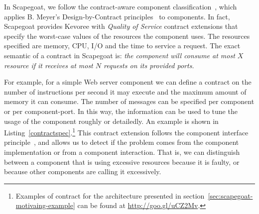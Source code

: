 In Scapegoat, we follow the contract-aware component classification~\cite{Beugnard774917}, which applies B. Meyer's Design-by-Contract principles~\cite{Meyer:1992:ADC:618974.619797} to components.
In fact, Scapegoat provides Kevoree with \textit{Quality of Service} contract extensions that specify the worst-case values of the resources the component uses.
The resources specified are memory, CPU, I/O and the time to service a request.
The exact semantic of a contract in Scapegoat is: \textit{the component will consume at most $X$ resource if it receives at most $N$ requests on its provided ports.}  

For example, for a simple Web server component we can define a contract on the number of instructions per second it may execute \cite{Binder200645} and the maximum amount of memory it can consume.
The number of messages can be specified per component or per component-port.
In this way, the information can be used to tune the usage of the component roughly or detailedly.
An example is shown in Listing~\ref{contractspec}.\footnote{Examples of contract for the architecture presented in section~\ref{sec:scapegoat-motivaing-example} can be found at \url{http://goo.gl/uCZ2Mv}.} This contract extension follows the component interface principle~\cite{Henzinger03}, and allows us to detect if the problem comes from the component implementation or from a component interaction.
That is, we can distinguish between a component that is using excessive resources because it is faulty, or because other components are calling it excessively.



